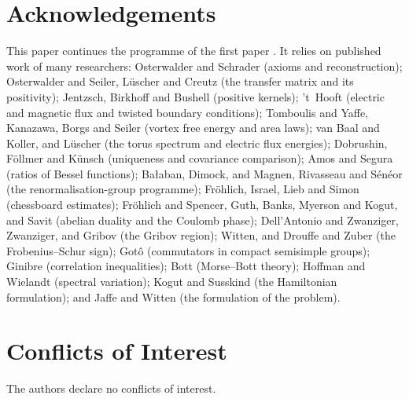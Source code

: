 \documentclass[11pt,a4paper]{amsart}
\theoremstyle{definition}
\theoremstyle{remark}
\numberwithin{equation}{section}
\begin{document}
\section*{Acknowledgements}
This paper continues the programme of the first paper \cite{bhattacharjee2026first}. It relies on published work of many researchers: Osterwalder and Schrader (axioms and reconstruction); Osterwalder and Seiler, L\"uscher and Creutz (the transfer matrix and its positivity); Jentzsch, Birkhoff and Bushell (positive kernels); 't~Hooft (electric and magnetic flux and twisted boundary conditions); Tomboulis and Yaffe, Kanazawa, Borgs and Seiler (vortex free energy and area laws); van Baal and Koller, and L\"uscher (the torus spectrum and electric flux energies); Dobrushin, F\"ollmer and K\"unsch (uniqueness and covariance comparison); Amos and Segura (ratios of Bessel functions); Ba{\l}aban, Dimock, and Magnen, Rivasseau and S\'en\'eor (the renormalisation-group programme); Fr\"ohlich, Israel, Lieb and Simon (chessboard estimates); Fr\"ohlich and Spencer, Guth, Banks, Myerson and Kogut, and Savit (abelian duality and the Coulomb phase); Dell'Antonio and Zwanziger, Zwanziger, and Gribov (the Gribov region); Witten, and Drouffe and Zuber (the Frobenius--Schur sign); Got\^o (commutators in compact semisimple groups); Ginibre (correlation inequalities); Bott (Morse--Bott theory); Hoffman and Wielandt (spectral variation); Kogut and Susskind (the Hamiltonian formulation); and Jaffe and Witten (the formulation of the problem).

\section*{Conflicts of Interest}
The authors declare no conflicts of interest.
\end{document}
